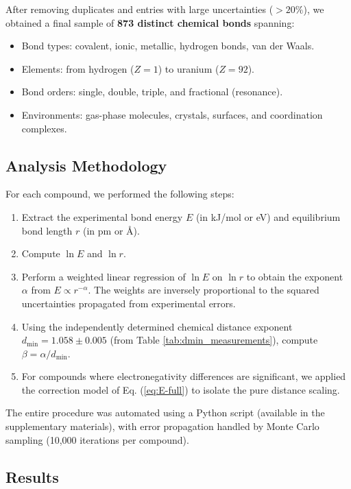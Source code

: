 \documentclass[12pt,a4paper]{article}
\theoremstyle{remark}
\begin{document}
After removing duplicates and entries with large uncertainties (\(>20\%\)), we obtained a final sample of \textbf{873 distinct chemical bonds} spanning:
\begin{itemize}
	\item Bond types: covalent, ionic, metallic, hydrogen bonds, van der Waals.
	\item Elements: from hydrogen (\(Z=1\)) to uranium (\(Z=92\)).
	\item Bond orders: single, double, triple, and fractional (resonance).
	\item Environments: gas-phase molecules, crystals, surfaces, and coordination complexes.
\end{itemize}

\subsection{Analysis Methodology}

For each compound, we performed the following steps:

\begin{enumerate}
	\item Extract the experimental bond energy \(E\) (in kJ/mol or eV) and equilibrium bond length \(r\) (in pm or Å).
	\item Compute \(\ln E\) and \(\ln r\).
	\item Perform a weighted linear regression of \(\ln E\) on \(\ln r\) to obtain the exponent \(\alpha\) from \(E \propto r^{-\alpha}\). The weights are inversely proportional to the squared uncertainties propagated from experimental errors.
	\item Using the independently determined chemical distance exponent \(d_{\text{min}} = 1.058 \pm 0.005\) (from Table \ref{tab:dmin_measurements}), compute \(\beta = \alpha / d_{\text{min}}\).
	\item For compounds where electronegativity differences are significant, we applied the correction model of Eq. (\ref{eq:E-full}) to isolate the pure distance scaling.
\end{enumerate}

The entire procedure was automated using a Python script (available in the supplementary materials), with error propagation handled by Monte Carlo sampling (10,000 iterations per compound).

\subsection{Results}
\end{document}
